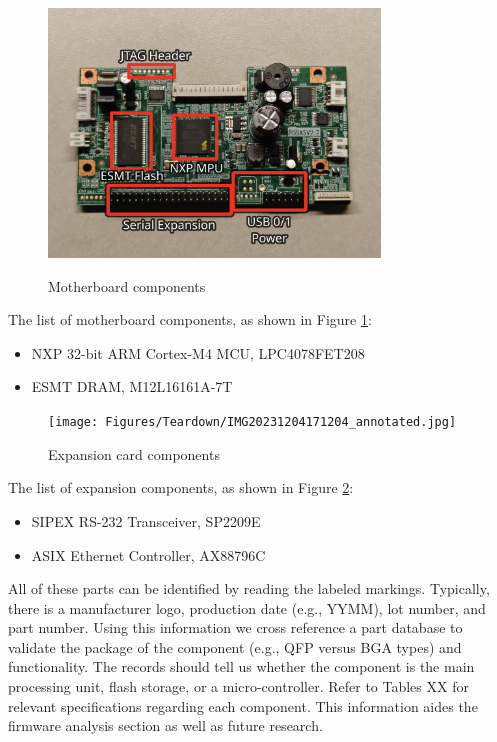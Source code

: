 \begin{figure}[ht]
    \centering
    {\includegraphics[width=88mm,scale=0.5]
    {Figures/Teardown/IMG20231204171516_annotated.jpg}}
    \caption{Motherboard components}
    \label{fig:snbc_btp_s80_motherboard}
\end{figure}

The list of motherboard components, as shown in Figure \ref{fig:snbc_btp_s80_motherboard}:
\begin{itemize}
    \item NXP 32-bit ARM Cortex-M4 MCU, LPC4078FET208
    \item ESMT DRAM, M12L16161A-7T
\end{itemize}

\begin{figure}[ht]
    \centering
    {\texttt{[image: Figures/Teardown/IMG20231204171204\_annotated.jpg]}}
    \caption{Expansion card components}
    \label{fig:snbc_btp_s80_expansion_components}
\end{figure}

The list of expansion components, as shown in Figure \ref{fig:snbc_btp_s80_expansion_components}:
\begin{itemize}
    \item SIPEX RS-232 Transceiver, SP2209E
    \item ASIX Ethernet Controller, AX88796C
\end{itemize}

All of these parts can be identified by reading the labeled markings. Typically, there is a manufacturer logo, production date (e.g., YYMM), lot number, and part number. Using this information we cross reference a part database to validate the package of the component (e.g., QFP versus BGA types) and functionality. The records should tell us whether the component is the main processing unit, flash storage, or a micro-controller. Refer to Tables XX for relevant specifications regarding each component. This information aides the firmware analysis section as well as future research.

